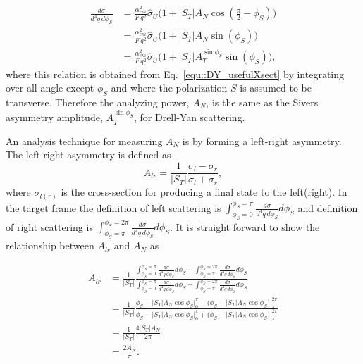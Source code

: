 \begin{align}
  \frac{d\sigma}{d^4 q \, d \phi_S} &= \frac{\alpha_{em}^2}{F \,
    q^2}\hat{\sigma}_U\Big(1+|S_T|A_N \cos (\frac{\pi}{2} - \phi_S) \Big)
  \\ \nonumber
  &= \frac{\alpha_{em}^2}{F \,
    q^2}\hat{\sigma}_U\Big(1+|S_T|A_N \sin(\phi_S) \Big)
  \\ \nonumber
  &= \frac{\alpha_{em}^2}{F \,
    q^2}\hat{\sigma}_U \Big(1+|S_T| A_{T}^{\sin \phi_S} \sin(\phi_S)\Big),
\end{align}
\noindent
where this relation is obtained from Eq.~\ref{equ::DY_usefulXsect} by
integrating over all angle except $\phi_S$ and where the polarization $S$ is
assumed to be transverse.  Therefore the analyzing power, $A_N$, is the same as
the Sivers asymmetry amplitude, $A_{T}^{\sin \phi_S}$, for Drell-Yan scattering.

An analysis technique for measuring $A_N$ is by forming a left-right asymmetry.
The left-right asymmetry is defined as 
\begin{equation}
  A_{lr} = \frac{1}{|S_T|}\frac{\sigma_l - \sigma_r}{\sigma_l + \sigma_r},
\end{equation}
\noindent
where $\sigma_{l(r)}$ is the cross-section for producing a final state to
the left(right).  In the target frame the definition of left scattering is
$\int_{\phi_S=0}^{\phi_S=\pi}\frac{d\sigma}{d^4 q \, d \phi_S} d\phi_S$ and
definition of right scattering is
$\int_{\phi_S=\pi}^{\phi_S=2\pi}\frac{d\sigma}{d^4 q \, d \phi_S} d\phi_S$.  It
is straight forward to show the relationship between $A_{lr}$ and $A_N$ as

\begin{align}
  A_{lr} &= \frac{1}{|S_T|}
  \frac{\int_{\phi_S=0}^{\phi_S=\pi} \frac{d\sigma}{d^4 q \, d \phi_S}d\phi_S
    - \int_{\phi_S=\pi}^{\phi_S=2\pi}\frac{d\sigma}{d^4 q \, d \phi_S}d\phi_S}
       {\int_{\phi_S=0}^{\phi_S=\pi}\frac{d\sigma}{d^4 q \, d \phi_S}d\phi_S
         + \int_{\phi_S=\pi}^{\phi_S=2\pi}\frac{d\sigma}{d^4 q \, d \phi_S}d\phi_S}
       \\ \nonumber
       &= \frac{1}{|S_T|}
       \frac{\phi_S -|S_T|A_N\cos\phi_S \Big|_0^{\pi}
       - \Big(\phi_S -|S_T|A_N\cos\phi_S \Big)\Big|_{\pi}^{2\pi}}
            {\phi_S -|S_T|A_N\cos\phi_S \Big|_0^{\pi}
              + \Big(\phi_S -|S_T|A_N\cos\phi_S \Big)\Big|_{\pi}^{2\pi}}
            \\ \nonumber
            &= \frac{1}{|S_T|}
            \frac{4|S_T|A_N}{2\pi}
            \\ \nonumber
            &= \frac{2A_N}{\pi}.
\end{align}

